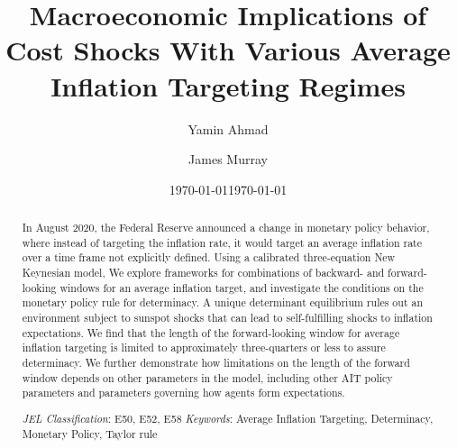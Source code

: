 \documentclass[english,authoryear,12pt]{elsarticle}
\begin{document}
	\begin{frontmatter}
		\title{Macroeconomic Implications of Cost Shocks With Various Average Inflation Targeting Regimes}
		\date{\today}
		\author[1]{Yamin Ahmad}
		\author[2]{James Murray}

		\address[1]{Dept. of Economics, University of Wisconsin - Whitewater, 809 W. Starin Road, Whitewater, WI 53190, USA}
		\address[2]{Dept. of Economics, University of Wisconsin - La Crosse, 1725 State St., La Crosse, WI 54601, USA}

	\date{\today}

	\begin{abstract}
		In August 2020, the Federal Reserve announced a change in monetary policy behavior, where instead of targeting the inflation rate, it would target an average inflation rate over a time frame not explicitly defined. Using a calibrated three-equation New Keynesian model, We explore frameworks for combinations of backward- and forward-looking windows for an average inflation target, and investigate the conditions on the monetary policy rule for determinacy. A unique determinant equilibrium rules out an environment subject to sunspot shocks that can lead to self-fulfilling shocks to inflation expectations. We find that the length of the forward-looking window for average inflation targeting is limited to approximately three-quarters or less to assure determinacy. We further demonstrate how limitations on the length of the forward window depends on other parameters in the model, including other AIT policy parameters and parameters governing how agents form expectations.

		\begin{flushleft}
			{\it JEL Classification}: E50, E52, E58 \newline
			{\it Keywords}: Average Inflation Targeting, Determinacy, Monetary Policy, Taylor rule
		\end{flushleft}
	\end{abstract}

\end{frontmatter}

\renewcommand{\thefootnote}{\arabic{footnote}}%
\setcounter{page}{1}%
\setcounter{footnote}{0}%
\end{document}
